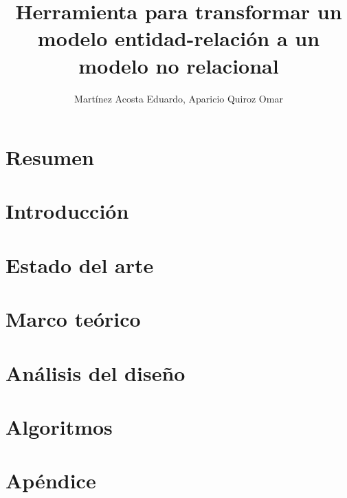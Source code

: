 \documentclass[12pt, a4paper]{report}
\title{Herramienta para transformar un modelo entidad-relación a un modelo no relacional}
\author{Martínez Acosta Eduardo, Aparicio Quiroz Omar}
\theoremstyle{definition}
\theoremstyle{remark}
\begin{document}


\tableofcontents
\listoffigures
\listoftables

\chapter*{Resumen}
\chapter{Introducción}

\chapter{Estado del arte}

\chapter{Marco teórico}

\chapter{Análisis del diseño}

\chapter{Algoritmos}

% 
\appendix
\chapter{Apéndice}

%
%
\printbibliography
\end{document}
